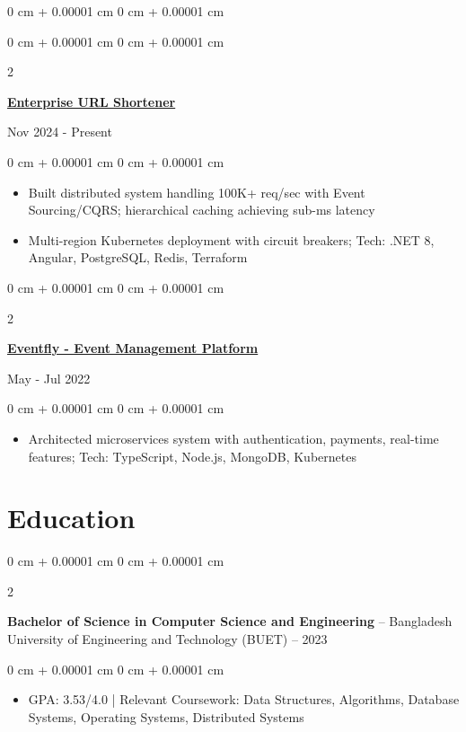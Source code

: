 \documentclass[10pt, letterpaper]{article}
\newenvironment{highlights}{
    \begin{itemize}[
        topsep=0.05 cm,
        parsep=0.05 cm,
        partopsep=0pt,
        itemsep=0pt,
        leftmargin=0 cm + 10pt
    ]
}{
    \end{itemize}
} %
\newenvironment{onecolentry}{
    \begin{adjustwidth}{
        0 cm + 0.00001 cm
    }{
        0 cm + 0.00001 cm
    }
}{
    \end{adjustwidth}
} %
\newenvironment{twocolentry}[2][]{
    \onecolentry
    \def\secondColumn{#2}
    \setcolumnwidth{\fill, 4.5 cm}
    \begin{paracol}{2}
}{
    \switchcolumn \raggedleft \secondColumn
    \end{paracol}
    \endonecolentry
} %
\newenvironment{header}{
    \setlength{\topsep}{0pt}\par\kern\topsep\centering\linespread{0.95}
}{
    \par\kern\topsep
} %
\begin{document}
\begin{header}
\begin{onecolentry}
        \begin{twocolentry}{
            Nov 2024 - Present
        }
            \href{https://github.com/thromel/URLShortener}{\textbf{Enterprise URL Shortener}}
        \end{twocolentry}
        \begin{onecolentry}
            \begin{highlights}
                \item Built distributed system handling 100K+ req/sec with Event Sourcing/CQRS; hierarchical caching achieving sub-ms latency
                \item Multi-region Kubernetes deployment with circuit breakers; Tech: .NET 8, Angular, PostgreSQL, Redis, Terraform
            \end{highlights}
        \end{onecolentry}

        \begin{twocolentry}{
            May - Jul 2022
        }
            \href{https://github.com/eventfly/Microservices}{\textbf{Eventfly - Event Management Platform}}
        \end{twocolentry}
        \begin{onecolentry}
            \begin{highlights}
                \item Architected microservices system with authentication, payments, real-time features; Tech: TypeScript, Node.js, MongoDB, Kubernetes
            \end{highlights}
        \end{onecolentry}

    \section{Education}
 
        \begin{twocolentry}{
            2018 – 2023
        }
            \textbf{Bachelor of Science in Computer Science and Engineering} -- Bangladesh University of Engineering and Technology (BUET)\end{twocolentry}
        \begin{onecolentry}
            \begin{highlights}
                \item GPA: 3.53/4.0 | Relevant Coursework: Data Structures, Algorithms, Database Systems, Operating Systems, Distributed Systems
            \end{highlights}
        \end{onecolentry}


\end{onecolentry}
\end{header}
\end{document}
